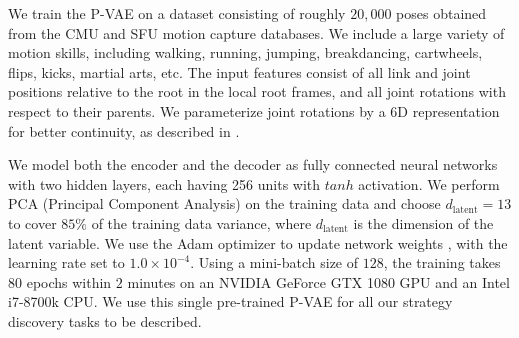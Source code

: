 We train the P-VAE on a dataset consisting of roughly $20,000$ poses obtained from the CMU and SFU motion capture databases. We include a large variety of motion skills, including walking, running, jumping, breakdancing, cartwheels, flips, kicks, martial arts, etc. The input features consist of all link and joint positions relative to the root in the local root frames, and all joint rotations with respect to their parents. We parameterize joint rotations by a $6$D representation for better continuity, as described in \cite{zhou2019continuity, Ling20}.

We model both the encoder and the decoder as fully connected neural networks with two hidden layers, each having 256 units with $tanh$ activation. We perform PCA (Principal Component Analysis) on the training data and choose $d_{\text{latent}} = 13$ to cover $85\%$ of the training data variance, where $d_{\text{latent}}$ is the dimension of the latent variable. We use the Adam optimizer to update network weights \cite{kingma2014adam}, with the learning rate set to $1.0\times10^{-4}$. Using a mini-batch size of $128$, the training takes $80$ epochs within $2$ minutes on an NVIDIA GeForce GTX 1080 GPU and an Intel i7-8700k CPU. We use this single pre-trained P-VAE for all our strategy discovery tasks to be described.

